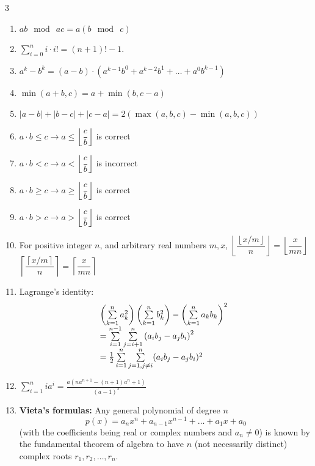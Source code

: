 \documentclass[8pt,a4paper,onesided]{article}
\begin{document}
\begin{multicols}{3}
\begin{enumerate}[resume]
    \item $\displaystyle ab \mod\ ac=a(b \mod\ c)$
    \item $\displaystyle \sum_{i = 0}^n{i\cdot i!=(n + 1)! - 1}$.
    \item $\displaystyle a^k - b^k = (a - b) \cdot (a^{k - 1}b^0 + a^{k - 2}b^1 + \dots + a^0b^{k - 1})$
    \item $\displaystyle \min(a + b, c) = a + \min(b, c - a)$
    \item $|a - b| + |b - c| + |c - a| = 2 (\max (a, b, c) - \min (a, b, c))$
    \item $\displaystyle a \cdot b \leq c \rightarrow a \leq \left \lfloor \dfrac{c}{b} \right \rfloor$ is correct
    \item $\displaystyle a \cdot b < c \rightarrow a <  \left \lfloor \dfrac{c}{b} \right \rfloor$ is incorrect
    \item $\displaystyle a \cdot b \geq c \rightarrow a \geq  \left \lfloor \dfrac{c}{b} \right \rfloor$ is correct
    \item $\displaystyle a \cdot b > c \rightarrow a >  \left \lfloor \dfrac{c}{b} \right \rfloor$ is correct
    \item For positive integer $n$, and arbitrary real numbers $m,x$,
    $\displaystyle \left \lfloor \dfrac{\left \lfloor x/m \right \rfloor}{n} \right \rfloor = \left \lfloor \dfrac{x}{mn} \right \rfloor$
    $\displaystyle \left \lceil \dfrac{\left \lceil x/m \right \rceil}{n} \right \rceil = \left \lceil \dfrac{x}{mn} \right \rceil$
    \item Lagrange’s identity:
    \[\displaystyle \displaystyle {\displaystyle {\begin{array}{@{}l}\left(\sum \limits_{k=1}^{n}a_{k}^{2}\right)\left(\sum \limits_{k=1}^{n}b_{k}^{2}\right)-\left(\sum\limits_{k=1}^{n}a_{k}b_{k}\right)^{2} \\ =\sum \limits_{i=1}^{n-1}\sum \limits_{j=i+1}^{n}\left(a_{i}b_{j}-a_{j}b_{i}\right)^{2} \\ ={\frac {1}{2}}\sum \limits_{i=1}^{n}\sum \limits_{j=1,j\neq i}^{n}(a_{i}b_{j}-a_{j}b_{i})^{2}\end{array}}}\]
    \item $\displaystyle \sum_{i = 1}^n{ia^i} = \frac{a(n a^{n + 1} - (n + 1) a^n + 1)}{(a - 1)^2}$
    \item \textbf{Vieta’s formulas:}
    Any general polynomial of degree $n$
    \[\displaystyle p(x) = a_nx^n + a_{n - 1}x^{n - 1} + \dots + a_1x + a_0\]
    (with the coefficients being real or complex numbers and $\displaystyle a_n \neq 0$) is known by the fundamental theorem of algebra to have $n$ (not necessarily distinct) complex roots $r_1, r_2,\dots, r_n$.

\end{enumerate}
\end{multicols}
\end{document}
